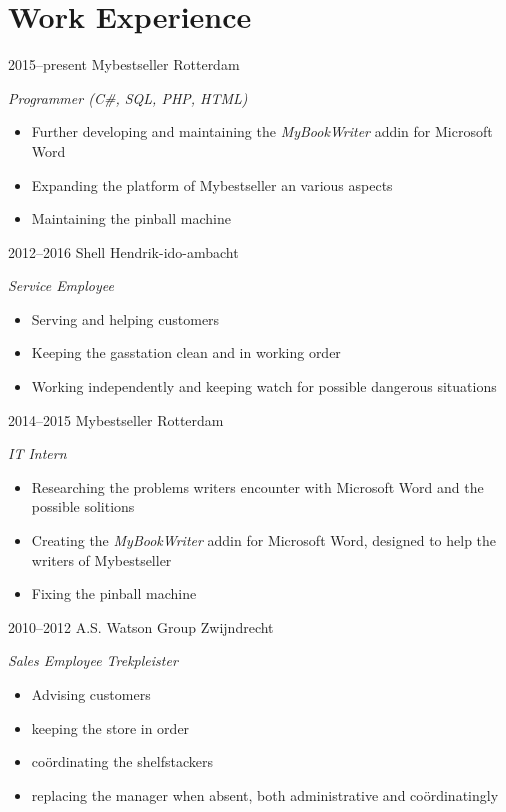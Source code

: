 \documentclass[]{friggeri-cv} %
\begin{document}
\clearpage

\section{Work Experience}

\begin{entrylist}
   \entry
   {2015--present}
   {Mybestseller}
   {Rotterdam}
   {\emph{Programmer (C\#, SQL, PHP, HTML)}
      \begin{itemize}
         \item Further developing and maintaining the \textit{MyBookWriter} addin for Microsoft Word
         \item Expanding the platform of Mybestseller an various aspects
         \item Maintaining the pinball machine
      \end{itemize}
   }
   \entry
   {2012--2016}
   {Shell}
   {Hendrik-ido-ambacht}
   {\emph{Service Employee}
      \begin{itemize}
         \item Serving and helping customers
         \item Keeping the gasstation clean and in working order
         \item Working independently and keeping watch for possible dangerous situations
      \end{itemize}
   }
   \entry
   {2014--2015}
   {Mybestseller}
   {Rotterdam}
   {\emph{IT Intern}
      \begin{itemize}
         \item Researching the problems writers encounter with Microsoft Word and the possible solitions
         \item Creating the \textit{MyBookWriter} addin for Microsoft Word, designed to help the writers of Mybestseller
         \item Fixing the pinball machine
      \end{itemize}
   }
   \entry
   {2010--2012}
   {A.S. Watson Group}
   {Zwijndrecht}
   {\emph{Sales Employee Trekpleister}
      \begin{itemize}
         \item Advising customers
         \item keeping the store in order
         \item co\"ordinating the shelfstackers
         \item replacing the manager when absent, both administrative and co\"ordinatingly
      \end{itemize}
   }
\end{entrylist}
\end{document}
